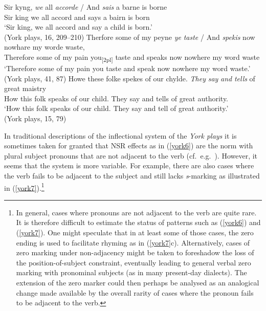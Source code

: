 \documentclass[output=paper]{langsci/langscibook}
\begin{document}
\ea
\label{york6}
\ea \gll Sir kyng, \textit{we} all \textit{accorde} / And \textit{sais} a barne is borne \\
Sir king we all accord {} and says a bairn is born\\
\glt `Sir king, we all accord and say a child is born.'\\
(York plays, 16, 209--210)
\ex \gll Therfore some of my peyne \textit{ye} \textit{taste} / And \textit{spekis} now nowhare my worde waste, \\
Therefore some of my pain you\textsubscript{[2pl]} taste {} and speaks now nowhere my word waste\\
\glt `Therefore some of my pain you taste and speak now nowhere my word waste.'\\
(York plays, 41, 87)
\ex
\gll Howe these folke spekes of our chylde. \textit{They} \textit{say} \textit{and} \textit{tells} of great maistry \\
How this folk speaks of our child. They say and tells of great authority. \\
\glt `How this folk speaks of our child. They say and tell of great authority.'\\
(York plays, 15, 79)
\z
\z

In traditional descriptions of the inflectional system of the \emph{York plays}
it is sometimes taken for granted that \gls{NSR}
effects as in (\ref{york6}) are the norm with plural subject pronouns that are
not adjacent to the verb (cf.\ e.g.\ \citealt[272]{BurrowTurville-Petre:2005}).
However, it seems that the  system is more variable. For
example, there are also cases where the verb fails to be adjacent to the
subject and still lacks \emph{s}-marking as illustrated in
(\ref{york7}).\footnote{In general, cases where pronouns are not adjacent to
the verb are quite rare. It is therefore difficult to estimate the status of
patterns such as (\ref{york6}) and (\ref{york7}). One might speculate that in
at least some of those cases, the zero ending is used to facilitate rhyming as
in (\ref{york7}c). Alternatively, cases of zero marking under non-adjacency might be
taken to foreshadow the loss of the position-of-subject constraint, eventually
leading to general verbal zero marking with pronominal subjects (as in many
present-day dialects). The extension of the zero marker could then perhaps be
analysed as an analogical change made available by the overall rarity of cases
where the pronoun fails to be adjacent to the verb.}
\end{document}
